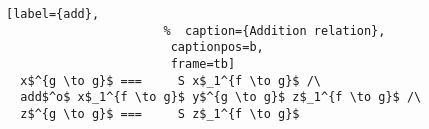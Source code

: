 \begin{figure}[!t]
  \centering
  \begin{minipage}{\columnwidth}
    \begin{lstlisting}[label={add},
                      %  caption={Addition relation},
                       captionpos=b,
                       frame=tb]
  x$^{g \to g}$ ===     S x$_1^{f \to g}$ /\
  add$^o$ x$_1^{f \to g}$ y$^{g \to g}$ z$_1^{f \to g}$ /\
  z$^{g \to g}$ ===     S z$_1^{f \to g}$
    \end{lstlisting}
  \end{minipage}
\end{figure}